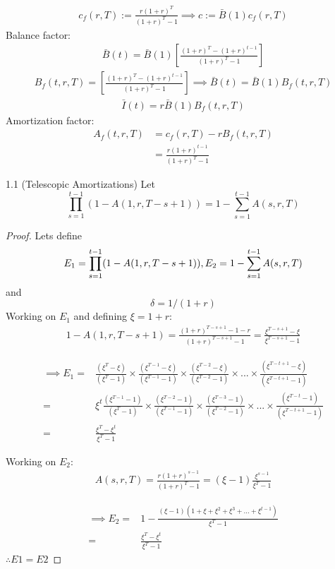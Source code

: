 \begin{align}
    c_f(r,T):=\frac{r(1+r)^T}{(1+r)^T-1} \implies c:=\bar{B}(1)c_f(r,T)
\end{align}
Balance factor:
\begin{align}
    \bar{B}(t)=\bar{B}(1)\left[ \frac{(1+r)^T-(1+r)^{t-1}}{(1+r)^T-1} \right]
\end{align}
\begin{align}
    B_f(t,r,T)=\left[ \frac{(1+r)^T-(1+r)^{t-1}}{(1+r)^T-1} \right] \implies \bar{B}(t)=\bar{B}(1)B_f(t,r,T)
\end{align}
\begin{align}
    \bar{I}(t) = r\bar{B}(1)B_f(t,r,T)
\end{align}
Amortization factor:
\begin{align}
    A_f(t,r,T) &= c_f(r,T)-rB_f(t,r,T)\\
    &=\frac{r(1+r)^{t-1}}{(1+r)^T-1}
\end{align}


\begin{theorem}{1.1 (Telescopic Amortizations)}{} \label{teo:1}
Let
\[
\prod^{t-1}_{s=1}(1-A(1,r,T-s+1))=1-\sum^{t-1}_{s=1}A(s,r,T)
\]
\end{theorem}

\begin{proof}{}{} Lets define
\[
E_1=\prod^{t-1}_{s=1}(1-A(1,r,T-s+1)), \\
E_2 =1-\sum^{t-1}_{s=1}A(s,r,T)
\]
and
\[
\delta =1/(1+r)
\]
Working on $E_1$ and defining $\xi=1+r$:
\begin{align}
1-A(1,r,T-s+1) = \frac{(1+r)^{T-s+1}-1-r}{(1+r)^{T-s+1}-1}=\frac{\xi^{T-s+1}-\xi}{\xi^{T-s+1}-1} \nonumber
\end{align}

\begin{align}
\implies E_1 =& \frac{(\xi^T-\xi)}{(\xi^T-1)}\times \frac{(\xi^{T-1}-\xi)}{(\xi^{T-1}-1)} \times \frac{(\xi^{T-2}-\xi)}{(\xi^{T-2}-1)} \times ... \times \frac{(\xi^{T-t+1}-\xi)}{(\xi^{T-t+1}-1)} \nonumber\\
=&\xi^t \frac{(\xi^{T-1}-1)}{(\xi^T-1)}\times \frac{(\xi^{T-2}-1)}{(\xi^{T-1}-1)} \times \frac{(\xi^{T-3}-1)}{(\xi^{T-2}-1)} \times ... \times \frac{(\xi^{T-t}-1)}{(\xi^{T-t+1}-1)} \nonumber\\
=&\frac{\xi^T-\xi^t}{\xi^T-1} \label{eq:e1}
\end{align}

Working on $E_2$:
\begin{align}
A(s,r,T) = \frac{r(1+r)^{s-1}}{(1+r)^{T}-1}=(\xi-1)\frac{\xi^{s-1}}{\xi^{T}-1} \nonumber
\end{align}

\begin{align}
\implies E_2 =& 1-\frac{(\xi-1)(1+\xi+\xi^2+\xi^3+...+\xi^{t-1})}{\xi^T-1}\nonumber\\
=&\frac{\xi^T-\xi^t}{\xi^T-1} 
\end{align}
$\therefore E1=E2$
\end{proof}

